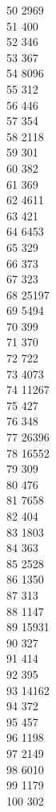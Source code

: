 { 50	2969 \\
 51	400 \\
 52	346 \\
 53	367 \\
 54	8096 \\
 55	312 \\
 56	446 \\
 57	354 \\
 58	2118 \\
 59	301 \\
 60	382 \\
 61	369 \\
 62	4611 \\
 63	421 \\
 64	6453 \\
 65	329 \\
 66	373 \\
 67	323 \\
 68	25197 \\
 69	5494 \\
 70	399 \\
 71	370 \\
 72	722 \\
 73	4073 \\
 74	11267 \\
 75	427 \\
 76	348 \\
 77	26396 \\
 78	16552 \\
 79	309 \\
 80	476 \\
 81	7658 \\
 82	404 \\
 83	1803 \\
 84	363 \\
 85	2528 \\
 86	1350 \\
 87	313 \\
 88	1147 \\
 89	15931 \\
 90	327 \\
 91	414 \\
 92	395 \\
 93	14162 \\
 94	372 \\
 95	457 \\
 96	1198 \\
 97	2149 \\
 98	6010 \\
 99	1179 \\
 100	302 \\
}
